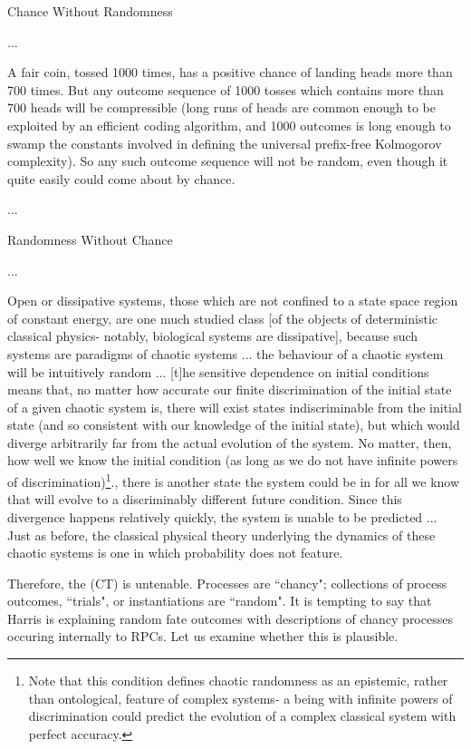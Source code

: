 \begin{longquote}
Chance Without Randomness

...

A fair coin, tossed 1000 times, has a positive chance of landing heads more than 700 times. But any outcome sequence of 1000 tosses which contains more than 700 heads will be compressible (long runs of heads are common enough to be exploited by an efficient coding algorithm, and 1000 outcomes is long enough to swamp the constants involved in defining the universal prefix-free Kolmogorov complexity). So any such outcome sequence will not be random, even though it quite easily could come about by chance. 

...

Randomness Without Chance

...

Open or dissipative systems, those which are not confined to a state space region of constant energy, are one much studied class [of the objects of deterministic classical physics- notably, biological systems are dissipative], because such systems are paradigms of chaotic systems ... the behaviour of a chaotic system will be intuitively random ... [t]he sensitive dependence on initial conditions means that, no matter how accurate our finite discrimination of the initial state of a given chaotic system is, there will exist states indiscriminable from the initial state (and so consistent with our knowledge of the initial state), but which would diverge arbitrarily far from the actual evolution of the system. No matter, then, how well we know the initial condition (as long as we do not have infinite powers of discrimination)\footnote{Note that this condition defines chaotic randomness as an epistemic, rather than ontological, feature of complex systems- a being with infinite powers of discrimination could predict the evolution of a complex classical system with perfect accuracy.}., there is another state the system could be in for all we know that will evolve to a discriminably different future condition. Since this divergence happens relatively quickly, the system is unable to be predicted ... Just as before, the classical physical theory underlying the dynamics of these chaotic systems is one in which probability does not feature. 
\cite{Eagle2018}
\end{longquote}

Therefore, the (CT) is untenable. Processes are ``chancy"; collections of process outcomes, ``trials", or instantiations are ``random". It is tempting to say that Harris is explaining random fate outcomes with descriptions of chancy processes occuring internally to RPCs. Let us examine whether this is plausible. 

